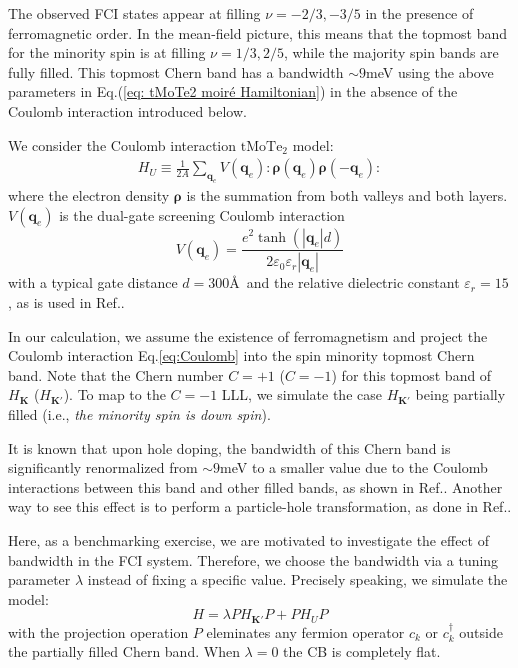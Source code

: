 The observed FCI states appear at filling $\nu=-2/3,-3/5$ in the presence of ferromagnetic order. In the mean-field picture, this means that the topmost band for the minority spin is at filling $\nu=1/3,2/5$, while the majority spin bands are fully filled. This topmost Chern band has a bandwidth $\sim 9$meV using the above parameters in Eq.(\ref{eq: tMoTe2 moiré Hamiltonian}) in the absence of the Coulomb interaction introduced below.

We consider the Coulomb interaction $\mathrm{tMoTe_2}$ model:
\begin{align}
    H_U\equiv \frac{1}{2A}\sum_{\mathbf q_e} V(\mathbf q_e):\boldsymbol\rho(\mathbf q_e)\boldsymbol\rho(-\mathbf q_e):\label{eq:Coulomb}
\end{align}
where the electron density $\boldsymbol\rho$ is the summation from both valleys and both layers. $V(\mathbf q_e)$ is the dual-gate screening Coulomb interaction
\begin{equation}
    V(\mathbf q_e)=\frac{e^2\tanh(|\mathbf q_e|d)}{2\varepsilon_0\varepsilon_r|\mathbf q_e|}
\end{equation}
with a typical gate distance $d=300$\AA~and the relative dielectric constant $\varepsilon_r=15$, as is used in Ref.\cite{wang2023fractional}.

In our calculation, we assume the existence of ferromagnetism and project the Coulomb interaction Eq.\eqref{eq:Coulomb} into the spin minority topmost Chern band. Note that the Chern number $C=+1$ ($C=-1$) for this topmost band of $H_\mathbf{K}$ ($H_{\mathbf{K'}}$). To map to the $C=-1$ LLL, we simulate the case $H_{\mathbf{K'}}$ being partially filled (i.e., \emph{the minority spin is down spin}).


It is known that upon hole doping, the bandwidth of this Chern band is significantly renormalized from $\sim 9$meV to a smaller value due to the Coulomb interactions between this band and other filled bands, as shown in Ref.\cite{dong2023composite}. Another way to see this effect is to perform a particle-hole transformation, as done in Ref.\cite{wang2023fractional}.

Here, as a benchmarking exercise, we are motivated to investigate the effect of bandwidth in the FCI system. Therefore, we choose the bandwidth via a tuning parameter $\lambda$ instead of fixing a specific value. Precisely speaking, we simulate the model:
\begin{equation}
    H=\lambda P H_{\mathbf{K'}} P + P H_U P \label{eq:simulated_model}
\end{equation}
with the projection operation $P$ eleminates any fermion operator $c_k$ or $c^\dagger_k$ outside the partially filled Chern band. When $\lambda=0$ the CB is completely flat.

